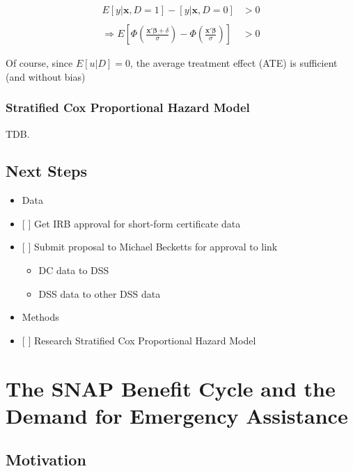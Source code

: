 \documentclass[12pt,letterpaperpaper,]{book}
\providecommand{\tightlist}{%
  \setlength{\itemsep}{0pt}\setlength{\parskip}{0pt}}
\begin{document}
\[
\begin{aligned}
  E[y|\bm{x}, D=1] - [y|\bm{x}, D=0] &> 0 \\
  \\
  \Rightarrow E \left [ 
        \Phi \left (\frac{\bm{x'\beta}  + \delta}{\sigma} \right )
      -
        \Phi \left (\frac{\bm{x'\beta}}{\sigma} \right )
     \right ]  &> 0
\end{aligned}
\]

Of course, since \(E[u|D] = 0\), the average treatment effect (ATE) is
sufficient (and without bias)

\subsection*{Stratified Cox Proportional Hazard
Model}\label{stratified-cox-proportional-hazard-model}

TDB.

\section*{Next Steps}\label{next-steps}

\begin{itemize}
\tightlist
\item
  Data
\item
  {[} {]} Get IRB approval for short-form certificate data
\item
  {[} {]} Submit proposal to Michael Becketts for approval to link

  \begin{itemize}
  \tightlist
  \item
    DC data to DSS
  \item
    DSS data to other DSS data
  \end{itemize}
\item
  Methods
\item
  {[} {]} Research Stratified Cox Proportional Hazard Model
\end{itemize}

\chapter{The SNAP Benefit Cycle and the Demand for Emergency
Assistance}\label{chapter-3}

\section*{Motivation}\label{motivation-2}
\end{document}
